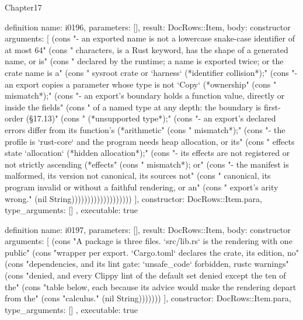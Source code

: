\begin{lexlean}{Chapter17}
\begin{semanticmodule}
definition{
  name: i0196,
  parameters: [],
  result: DocRows::Item,
  body: constructor{
    arguments: [
      (cons "- an exported name is not a lowercase snake-case identifier of at most 64" (cons "  characters, is a Rust keyword, has the shape of a generated name, or is" (cons "  declared by the runtime; a name is exported twice; or the crate name is a" (cons "  sysroot crate or `harness` (*identifier collision*);" (cons "- an export copies a parameter whose type is not `Copy` (*ownership" (cons "  mismatch*);" (cons "- an export's boundary holds a function value, directly or inside the fields" (cons "  of a named type at any depth: the boundary is first-order (§17.13)" (cons "  (*unsupported type*);" (cons "- an export's declared errors differ from its function's (*arithmetic" (cons "  mismatch*);" (cons "- the profile is `rust-core` and the program needs heap allocation, or its" (cons "  effects state `allocation` (*hidden allocation*);" (cons "- its effects are not registered or not strictly ascending (*effects" (cons "  mismatch*); or" (cons "- the manifest is malformed, its version not canonical, its sources not" (cons "  canonical, its program invalid or without a faithful rendering, or an" (cons "  export's arity wrong." (nil String)))))))))))))))))))
    ],
    constructor: DocRows::Item.para,
    type_arguments: []
  },
  executable: true
}

definition{
  name: i0197,
  parameters: [],
  result: DocRows::Item,
  body: constructor{
    arguments: [
      (cons "A package is three files. `src/lib.rs` is the rendering with one public" (cons "wrapper per export. `Cargo.toml` declares the crate, its edition, no" (cons "dependencies, and its lint gate: `unsafe_code` forbidden, rustc warnings" (cons "denied, and every Clippy lint of the default set denied except the ten of the" (cons "table below, each because its advice would make the rendering depart from the" (cons "calculus." (nil String)))))))
    ],
    constructor: DocRows::Item.para,
    type_arguments: []
  },
  executable: true
}


\end{semanticmodule}
\end{lexlean}
